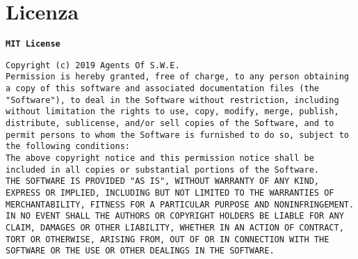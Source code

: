 \section{Licenza}\label{Licenza}
\textbf{\texttt{MIT License}}

\texttt{Copyright (c) 2019 Agents Of S.W.E.}\\

\texttt{Permission is hereby granted, free of charge, to any person obtaining a copy
of this software and associated documentation files (the "Software"), to deal
in the Software without restriction, including without limitation the rights
to use, copy, modify, merge, publish, distribute, sublicense, and/or sell
copies of the Software, and to permit persons to whom the Software is
furnished to do so, subject to the following conditions:}\\

\texttt{The above copyright notice and this permission notice shall be included in all
copies or substantial portions of the Software.}\\

\texttt{THE SOFTWARE IS PROVIDED "AS IS", WITHOUT WARRANTY OF ANY KIND, EXPRESS OR
IMPLIED, INCLUDING BUT NOT LIMITED TO THE WARRANTIES OF MERCHANTABILITY,
FITNESS FOR A PARTICULAR PURPOSE AND NONINFRINGEMENT. IN NO EVENT SHALL THE
AUTHORS OR COPYRIGHT HOLDERS BE LIABLE FOR ANY CLAIM, DAMAGES OR OTHER
LIABILITY, WHETHER IN AN ACTION OF CONTRACT, TORT OR OTHERWISE, ARISING FROM,
OUT OF OR IN CONNECTION WITH THE SOFTWARE OR THE USE OR OTHER DEALINGS IN THE
SOFTWARE.}
